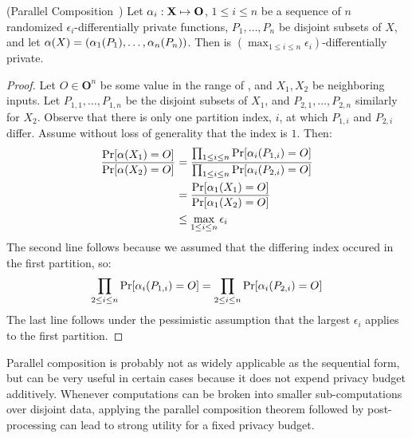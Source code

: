 \documentclass[11pt,twoside]{scrartcl}
\begin{document}
\begin{theorem}{(Parallel Composition~\cite{McSherry2009})}
Let $\alpha_i : \mathbf{X} \mapsto \mathbf{O}$, $1 \le i \le n$ be a sequence of $n$ randomized $\epsilon_i$-differentially private functions, $P_1, \ldots, P_n$ be disjoint subsets of $X$, and let $\alpha(X) = (\alpha_1(P_1), \ldots, \alpha_n(P_n))$. Then \san is $(\max_{1 \le i \le n} \epsilon_i)$-differentially private.
\end{theorem}

\begin{proof}
Let $O \in \mathbf{O}^n$ be some value in the range of \san, and $X_1, X_2$ be neighboring inputs. Let $P_{1,1}, \ldots, P_{1,n}$ be the disjoint subsets of $X_1$, and $P_{2,1}, \ldots, P_{2,n}$ similarly for $X_2$. Observe that there is only one partition index, $i$, at which $P_{1,i}$ and $P_{2,i}$ differ. Assume without loss of generality that the index is $1$. Then:
\begin{align*}
\frac{
  \mathrm{Pr}[\alpha(X_1) = O]
}{
  \mathrm{Pr}[\alpha(X_2) = O]
}
&=
\frac{
  \prod_{1 \le i \le n} \mathrm{Pr}[\alpha_i(P_{1,i}) = O]
}{
  \prod_{1 \le i \le n} \mathrm{Pr}[\alpha_i(P_{2,i}) = O]
}
\\
&=
\frac{
  \mathrm{Pr}[\alpha_1(X_1) = O]
}{
  \mathrm{Pr}[\alpha_1(X_2) = O]
}
\\
&\le
\max_{1 \le i \le n} \epsilon_i
\end{align*}
The second line follows because we assumed that the differing index occured in the first partition, so:
\[
\prod_{2 \le i \le n} \mathrm{Pr}[\alpha_i(P_{1,i}) = O] = \prod_{2 \le i \le n} \mathrm{Pr}[\alpha_i(P_{2,i}) = O]
\]
The last line follows under the pessimistic assumption that the largest $\epsilon_i$ applies to the first partition.
\end{proof}

Parallel composition is probably not as widely applicable as the sequential form, but can be very useful in certain cases because it does not expend privacy budget additively. Whenever computations can be broken into smaller sub-computations over disjoint data, applying the parallel composition theorem followed by post-processing can lead to strong utility for a fixed privacy budget.


\end{document}
